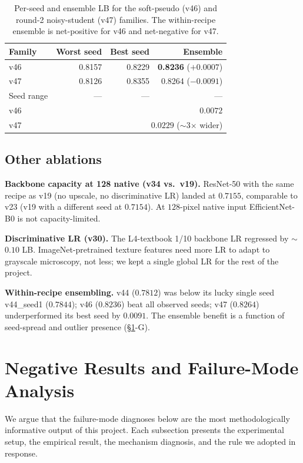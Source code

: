 \documentclass[conference]{IEEEtran}
\begin{document}
\begin{table}[!t]
  \centering
  \caption{Per-seed and ensemble LB for the soft-pseudo (v46) and round-2 noisy-student (v47) families. The within-recipe ensemble is net-positive for v46 and net-negative for v47.}
  \label{tab:seedspread}
  \footnotesize
  \begin{tabular}{@{}lrrr@{}}
    \toprule
    Family & Worst seed & Best seed & Ensemble \\
    \midrule
    v46 & 0.8157 & 0.8229 & \textbf{0.8236} ($+0.0007$) \\
    v47 & 0.8126 & 0.8355 & 0.8264 ($-0.0091$) \\
    \midrule
    Seed range & --- & --- & --- \\
    v46 & \multicolumn{3}{r}{$0.0072$} \\
    v47 & \multicolumn{3}{r}{$0.0229$ \quad ($\sim$3$\times$ wider)} \\
    \bottomrule
  \end{tabular}
\end{table}

\subsection{Other ablations}

\textbf{Backbone capacity at 128 native (v34 vs.\ v19).} ResNet-50 with the same recipe as v19 (no upscale, no discriminative LR) landed at $0.7155$, comparable to v23 (v19 with a different seed at $0.7154$). At $128$-pixel native input EfficientNet-B0 is not capacity-limited.

\textbf{Discriminative LR (v30).} The L4-textbook 1/10 backbone LR regressed by $\sim$$0.10$ LB. ImageNet-pretrained texture features need more LR to adapt to grayscale microscopy, not less; we kept a single global LR for the rest of the project.

\textbf{Within-recipe ensembling.} v44 ($0.7812$) was below its lucky single seed v44\_seed1 ($0.7844$); v46 ($0.8236$) beat all observed seeds; v47 ($0.8264$) underperformed its best seed by $0.0091$. The ensemble benefit is a function of seed-spread and outlier presence (\S\ref{sec:negative}-G).

\section{Negative Results and Failure-Mode Analysis}
\label{sec:negative}

We argue that the failure-mode diagnoses below are the most methodologically informative output of this project. Each subsection presents the experimental setup, the empirical result, the mechanism diagnosis, and the rule we adopted in response.
\end{document}
